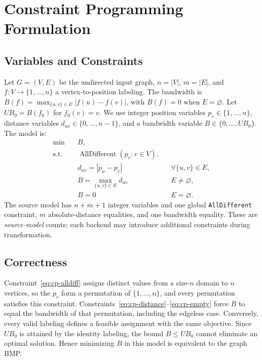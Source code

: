 \section{Constraint Programming Formulation}\label{sec:cp}

\subsection{Variables and Constraints}\label{sec:cp-model}
Let $G=(V,E)$ be the undirected input graph, $n=|V|$, $m=|E|$, and
$f:V\rightarrow\{1,\ldots,n\}$ a vertex-to-position labeling.
The bandwidth is $B(f)=\max_{\{u,v\}\in E}|f(u)-f(v)|$, with $B(f)=0$
when $E=\varnothing$. Let $UB_0=B(f_0)$ for $f_0(v)=v$.
We use integer position variables $p_v\in\{1,\ldots,n\}$, distance
variables $d_{uv}\in\{0,\ldots,n-1\}$, and a bandwidth variable
$B\in\{0,\ldots,UB_0\}$. The model is:
\begin{align}
\min\quad & B, \label{eq:cp-objective}\\
\text{s.t.}\quad & \operatorname{AllDifferent}(p_v:v\in V),\label{eq:cp-alldiff}\\
&d_{uv}=|p_u-p_v| &&\forall\{u,v\}\in E,\label{eq:cp-distance}\\
&B=\max_{\{u,v\}\in E}d_{uv} && E\ne\varnothing,\label{eq:cp-max}\\
&B=0 && E=\varnothing.\label{eq:cp-empty}
\end{align}
The source model has $n+m+1$ integer variables and one global
\texttt{AllDifferent} constraint, $m$ absolute-distance equalities,
and one bandwidth equality. These are \emph{source-model} counts;
each backend may introduce additional constraints during transformation.

\subsection{Correctness}\label{sec:cp-correctness}
Constraint~\eqref{eq:cp-alldiff} assigns distinct values from a
size-$n$ domain to $n$ vertices, so the $p_v$ form a permutation of
$\{1,\ldots,n\}$, and every permutation satisfies this constraint.
Constraints~\eqref{eq:cp-distance}--\eqref{eq:cp-empty} force $B$
to equal the bandwidth of that permutation, including the edgeless
case. Conversely, every valid labeling defines a feasible assignment
with the same objective. Since $UB_0$ is attained by the identity
labeling, the bound $B\le UB_0$ cannot eliminate an optimal solution.
Hence minimizing $B$ in this model is equivalent to the graph BMP.


